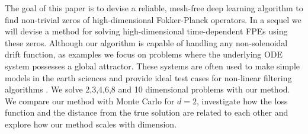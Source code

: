 The goal of this paper is to devise a reliable, mesh-free deep learning algorithm to find non-trivial zeros of high-dimensional Fokker-Planck operators. In a sequel we will devise a method for solving high-dimensional time-dependent FPEs using these zeros. Although our algorithm is capable of handling any non-solenoidal drift function, as examples we focus on problems where the underlying ODE system possesses a global attractor. These systems are often used to make simple models in the earth sciences and provide ideal test cases for non-linear filtering algorithms \cite{carrassi2022data}. We solve 2,3,4,6,8 and 10 dimensional problems with our method. We compare our method with Monte Carlo for $d=2$, investigate how the loss function and the distance from the true solution are related to each other and explore how our method scales with dimension.

